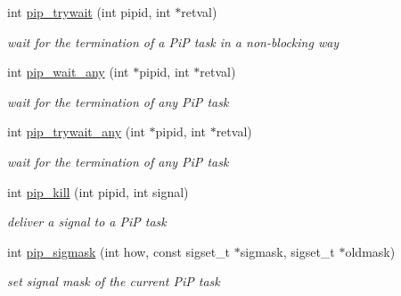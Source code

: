 \begin{DoxyCompactItemize}
\item 
int \hyperlink{group__libpip_ga02cab8b77b62ffcd98bd1bbb1e32b7e7}{pip\-\_\-trywait} (int pipid, int $\ast$retval)
\begin{DoxyCompactList}\small\item\em wait for the termination of a Pi\-P task in a non-\/blocking way \end{DoxyCompactList}\end{DoxyCompactItemize}
\begin{DoxyCompactItemize}
\item 
int \hyperlink{group__libpip_gade2b18ac0e11ec827ad68656591c7518}{pip\-\_\-wait\-\_\-any} (int $\ast$pipid, int $\ast$retval)
\begin{DoxyCompactList}\small\item\em wait for the termination of any Pi\-P task \end{DoxyCompactList}\end{DoxyCompactItemize}
\begin{DoxyCompactItemize}
\item 
int \hyperlink{group__libpip_ga65731447fedb85cbe4d5c38093383a20}{pip\-\_\-trywait\-\_\-any} (int $\ast$pipid, int $\ast$retval)
\begin{DoxyCompactList}\small\item\em wait for the termination of any Pi\-P task \end{DoxyCompactList}\end{DoxyCompactItemize}
\begin{DoxyCompactItemize}
\item 
int \hyperlink{group__libpip_ga4a396f38920d94b71dcfd3c898fbb82b}{pip\-\_\-kill} (int pipid, int signal)
\begin{DoxyCompactList}\small\item\em deliver a signal to a Pi\-P task \end{DoxyCompactList}\end{DoxyCompactItemize}
\begin{DoxyCompactItemize}
\item 
int \hyperlink{group__libpip_gaf546ee24368b118e937aadd2dbea2217}{pip\-\_\-sigmask} (int how, const sigset\-\_\-t $\ast$sigmask, sigset\-\_\-t $\ast$oldmask)
\begin{DoxyCompactList}\small\item\em set signal mask of the current Pi\-P task \end{DoxyCompactList}\end{DoxyCompactItemize}
